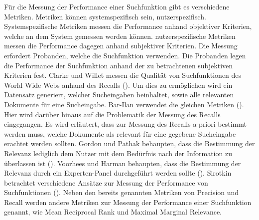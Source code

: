 
Für die Messung der Performance einer Suchfunktion gibt es verschiedene Metriken.
Metriken können systemspezifisch sein, nutzerspezifisch.
Systemspezifische Metriken messen die Performance anhand objektiver Kriterien, welche an dem System gemessen werden können.
nutzerspezifische Metriken messen die Performance dagegen anhand subjektiver Kriterien.
Die Messung erfordert Probanden, welche die Suchfunktion verwenden.
Die Probanden legen die Performance der Suchfunktion anhand der zu betrachtenen subjektiven Kriterien fest.
Clarke und Willet messen die Qualität von Suchfunktionen des World Wide Webs anhand des Recalls (\cite{Clarke_Willett_1997}).
Um dies zu ermöglichen wird ein Datensatz generiert, welcher Sucheingaben beinhaltet, sowie alle relevanten Dokumente für eine Sucheingabe.
Bar-Ilan verwendet die gleichen Metriken (\cite{Bar-Ilan_2002}).
Hier wird darüber hinaus auf die Problematik der Messung des Recalls eingegangen.
Es wird erläutert, dass zur Messung des Recalls a-priori bestimmt werden muss, welche Dokumente als relevant für eine gegebene Sucheingabe erachtet werden sollten.
Gordon und Pathak behaupten, dass die Bestimmung der Relevanz lediglich dem Nutzer mit dem Bedürfnis nach der Information zu überlassen ist (\cite{Gordon_Pathak_1999}).
Voorhees und Harman behaupten, dass die Bestimmung der Relevanz durch ein Experten-Panel durchgeführt werden sollte (\cite{Voorhees_Harman_2001}).
Sirotkin betrachtet verschiedene Ansätze zur Messung der Performance von Suchfunktionen (\cite{Sirotkin_2012}).
Neben den bereits genannten Metriken von Precision und Recall werden andere Metriken zur Messung der Performance einer Suchfunktion genannt, wie Mean Reciprocal Rank und Maximal Marginal Relevance.\\
